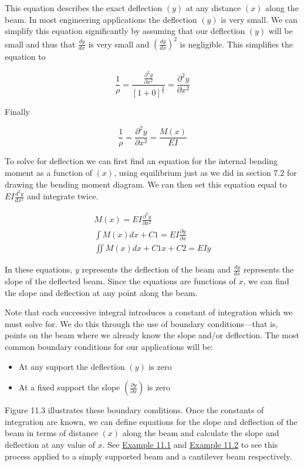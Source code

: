 \documentclass[
  letterpaper,
  DIV=11,
  numbers=noendperiod]{scrreprt}
\begin{document}
This equation describes the exact deflection \((y)\) at any distance
\((x)\) along the beam. In most engineering applications the deflection
\((y)\) is very small. We can simplify this equation significantly by
assuming that our deflection \((y)\) will be small and thus that
\(\frac{d y}{d x}\) is very small and
\(\left(\frac{d y}{d x}\right)^{2}\) is negligible. This simplifies the
equation to

\[
\frac{1}{\rho}=\frac{\frac{\partial^{2} y}{\partial x^{2}}}{[1+0]^{\frac{3}{2}}}=\frac{\partial^{2} y}{\partial x^{2}}
\]

Finally

\[
\frac{1}{\rho}=\frac{\partial^{2} y}{\partial x^{2}}=\frac{M(x)}{E I}
\]

To solve for deflection we can first find an equation for the internal
bending moment as a function of \((x)\), using equilibrium just as we
did in section 7.2 for drawing the bending moment diagram. We can then
set this equation equal to \(E I \frac{d^{2} y}{d x^{2}}\) and integrate
twice.

\[
\begin{gathered}
M(x)=E I \frac{\partial^{2} y}{\partial x^{2}} \\
\int M(x) d x+C 1=E I \frac{\partial y}{\partial x} \\
\iint M(x) d x+C 1 x+C 2=E I y
\end{gathered}
\]

In these equations, \(y\) represents the deflection of the beam and
\(\frac{d y}{d x}\) represents the slope of the deflected beam. Since
the equations are functions of \(x\), we can find the slope and
deflection at any point along the beam.

Note that each successive integral introduces a constant of integration
which we must solve for. We do this through the use of boundary
conditions---that is, points on the beam where we already know the slope
and/or deflection. The most common boundary conditions for our
applications will be:

\begin{itemize}
\item
  At any support the deflection \((y)\) is zero
\item
  At a fixed support the slope
  \(\left(\frac{\partial y}{\partial x}\right)\) is zero
\end{itemize}

Figure 11.3 illustrates these boundary conditions. Once the constants of
integration are known, we can define equations for the slope and
deflection of the beam in terms of distance \((x)\) along the beam and
calculate the slope and deflection at any value of \(x\). See
\hyperref[example-11.1]{Example 11.1} and
\hyperref[example-11.2]{Example 11.2} to see this process applied to a
simply supported beam and a cantilever beam respectively.
\end{document}
